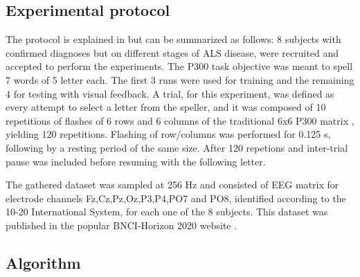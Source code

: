 \documentclass[entropy,article,submit,moreauthors,pdftex,10pt,a4paper]{mdpi}
\begin{document}
\subsection{Experimental protocol}

The protocol is explained in \citep{Riccio2013} but can be summarized as follows:  8 subjects with confirmed diagnoses but on different stages of ALS disease, were recruited and accepted to perform the experiments. The P300 task objective was meant to spell 7 words of 5 letter each.  The first 3 runs were used for training and the remaining 4 for testing with visual feedback.  A trial, for this experiment, was defined as every attempt to select a letter from the speller, and it was composed of 10 repetitions of flashes of 6 rows and 6 columns of the traditional 6x6 P300 matrix , yielding 120 repetitions.  Flashing of row/columns was performed for 0.125 s, following by a resting period of the same size.  After 120 repetions and inter-trial pause was included before resuming with the following letter.

The gathered dataset was sampled at 256 Hz and consisted of EEG matrix for electrode channels Fz,Cz,Pz,Oz,P3,P4,PO7 and PO8, identified according to the 10-20 International System,  for each one of the 8 subjects.  This dataset was published in the popular BNCI-Horizon 2020 website \citep{Brunner2014}.


%
%
%
%
%
%
%
%

\subsection{Algorithm}
\end{document}
